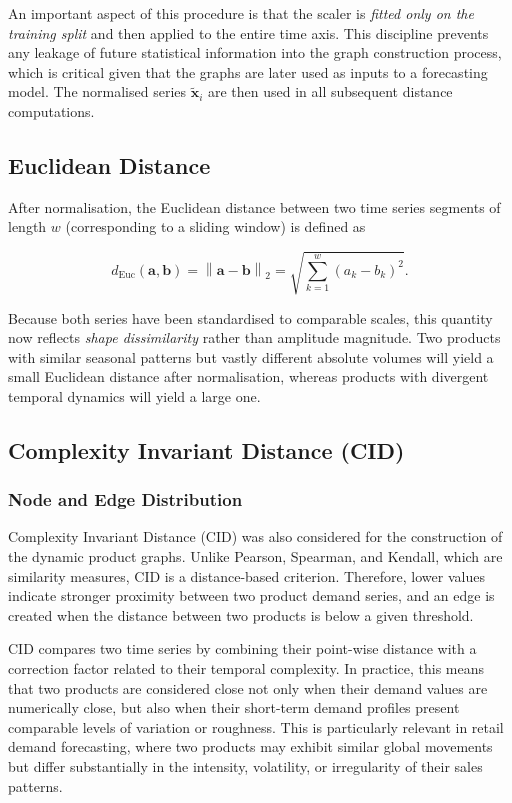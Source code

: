 An important aspect of this procedure is that the scaler is \textit{fitted only on the training split} and then applied to the entire time axis. This discipline prevents any leakage of future statistical information into the graph construction process, which is critical given that the graphs are later used as inputs to a forecasting model. The normalised series $\tilde{\mathbf{x}}_i$ are then used in all subsequent distance computations.

\subsection{Euclidean Distance}

After normalisation, the Euclidean distance between two time series segments of length $w$ (corresponding to a sliding window) is defined as

\begin{equation}
    d_{\text{Euc}}(\mathbf{a}, \mathbf{b}) = \left\| \mathbf{a} - \mathbf{b} \right\|_2 = \sqrt{\sum_{k=1}^{w} \left(a_k - b_k\right)^2}.
\end{equation}

Because both series have been standardised to comparable scales, this quantity now reflects \textit{shape dissimilarity} rather than amplitude magnitude. Two products with similar seasonal patterns but vastly different absolute volumes will yield a small Euclidean distance after normalisation, whereas products with divergent temporal dynamics will yield a large one.


\subsection{Complexity Invariant Distance (CID)}
\label{subsec:cid_graphs}

\subsubsection{Node and Edge Distribution}
\label{subsubsec:cid_node_edge_distribution}

Complexity Invariant Distance (CID) was also considered for the construction of the dynamic product graphs. Unlike Pearson, Spearman, and Kendall, which are similarity measures, CID is a distance-based criterion. Therefore, lower values indicate stronger proximity between two product demand series, and an edge is created when the distance between two products is below a given threshold.

CID compares two time series by combining their point-wise distance with a correction factor related to their temporal complexity. In practice, this means that two products are considered close not only when their demand values are numerically close, but also when their short-term demand profiles present comparable levels of variation or roughness. This is particularly relevant in retail demand forecasting, where two products may exhibit similar global movements but differ substantially in the intensity, volatility, or irregularity of their sales patterns.

